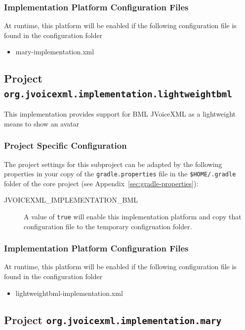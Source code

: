 \documentclass[11pt,a4paper]{article}
\begin{document}
\subsubsection{Implementation Platform Configuration Files}

At runtime, this platform will be enabled if the following configuration file is found in the configuration
folder
\begin{itemize}
\item mary-implementation.xml
\end{itemize}

\subsection{Project \texttt{org.jvoicexml.implementation.lightweightbml}}

This implementation provides support for BML JVoiceXML as a lightweight means to show an avatar

\subsubsection{Project Specific Configuration}

The project settings for this subproject can be adapted by the following 
properties in your copy of the \texttt{gradle.properties} file in the
\texttt{\${HOME}/.gradle} folder of the core project (see 
Appendix~\ref{sec:gradle-properties}):

\begin{description}
\item[JVOICEXML\_IMPLEMENTATION\_BML] A value of \texttt{true} will enable this implementation
platform and copy that configuration file to the temporary configruation folder.
\end{description}

\subsubsection{Implementation Platform Configuration Files}

At runtime, this platform will be enabled if the following configuration file is found in the configuration
folder
\begin{itemize}
\item lightweightbml-implementation.xml
\end{itemize}


\subsection{Project \texttt{org.jvoicexml.implementation.mary}}
\end{document}
